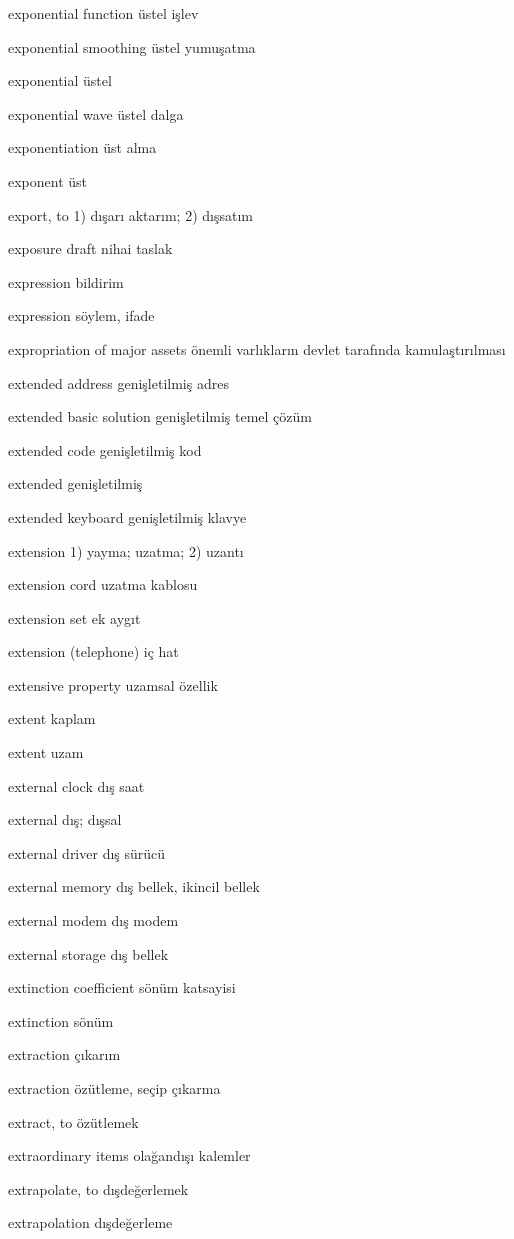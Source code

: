 \documentclass[12pt,fleqn]{article}\usepackage{../../common}
\begin{document}
exponential function üstel işlev

exponential smoothing üstel yumuşatma

exponential üstel

exponential wave üstel dalga

exponentiation üst alma

exponent üst

export, to 1) dışarı aktarım; 2) dışsatım

exposure draft nihai taslak

expression bildirim

expression söylem, ifade

expropriation of major assets önemli varlıkların devlet tarafında kamulaştırılması

extended address genişletilmiş adres

extended basic solution genişletilmiş temel çözüm

extended code genişletilmiş kod

extended genişletilmiş

extended keyboard genişletilmiş klavye

extension 1) yayma; uzatma; 2) uzantı

extension cord uzatma kablosu

extension set ek aygıt

extension (telephone) iç hat

extensive property uzamsal özellik

extent kaplam

extent uzam

external clock dış saat

external dış; dışsal

external driver dış sürücü

external memory dış bellek, ikincil bellek

external modem dış modem

external storage dış bellek

extinction coefficient sönüm katsayisi

extinction sönüm

extraction çıkarım

extraction özütleme, seçip çıkarma

extract, to özütlemek

extraordinary items olağandışı kalemler

extrapolate, to dışdeğerlemek

extrapolation dışdeğerleme
\end{document}
